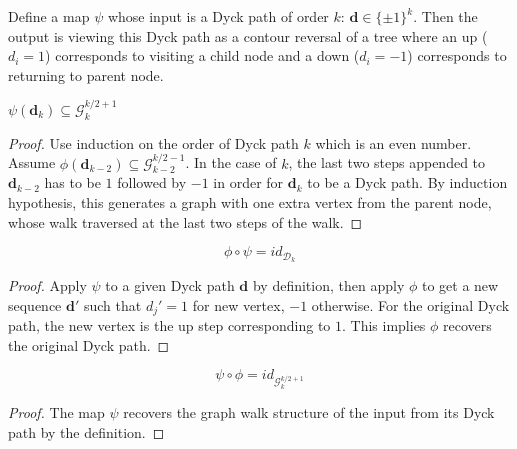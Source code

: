 \begin{definition}
    \notready
    \label{def:Dyck_to_graph_map}
   Define a map $\psi$ whose input is a Dyck path of order $k$: $\mathbf{d} \in \{\pm1\}^k$. Then the output is viewing
  this Dyck path as a contour reversal of a tree where an up ($d_i = 1$) corresponds to visiting a child node
  and a down ($d_i = -1$) corresponds to returning to parent node.
\end{definition}


\begin{lemma}
    \notready
    \label{lem:Dyck_graph_correspondence}
  $\psi(\mathbf{d}_k) \subseteq \mathcal{G}^{k/2 + 1}_k$
  \begin{proof}
    \notready
    Use induction on the order of Dyck path $k$ which is an even number. Assume $\phi(\mathbf{d}_{k-2})
    \subseteq \mathcal{G}_{k-2}^{k/2 -1}$. In the case of $k$, the last two steps appended to $\mathbf{d}_{k-2}$
    has to be $1$ followed by $-1$ in order for $\mathbf{d}_k$ to be a Dyck path. By induction hypothesis,
    this generates a graph with one extra vertex from the parent node, whose walk traversed at the last two steps of the walk.
  \end{proof}
\end{lemma}


\begin{lemma}
    \notready
    \label{lem:composition1}
  $$\phi \circ \psi = id_{\mathcal{D}_k}$$
  \begin{proof}
    \notready
    Apply $\psi$ to a given Dyck path $\mathbf{d}$ by definition, then apply $\phi$ to get a new sequence
    $\mathbf{d}'$ such that $d_j' = 1$ for new vertex, $-1$ otherwise. For the original Dyck path, the new
    vertex is the up step corresponding to $1$. This implies $\phi$ recovers the original Dyck path.
  \end{proof}
\end{lemma}


\begin{lemma}
    \notready
    \label{lem:composition2}
  $$\psi \circ \phi = id_{\mathcal{G}^{k/2 + 1}_k}$$
   \begin{proof}
    \notready
    The map $\psi$ recovers the graph walk structure of the input from its Dyck path by the definition.
  \end{proof}
\end{lemma}


